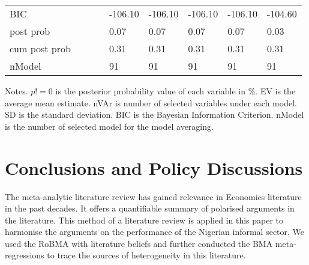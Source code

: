 \documentclass[12pt, english]{article}
\begin{document}
\begin{table}[H]
{\begin{tabular}{@{}lllllllll@{}}
                BIC                         &        &         &        & -106.10 & -106.10 & -106.10 & -106.10 & -104.60 \\
                post prob                   &        &         &        & 0.07    & 0.07    & 0.07    & 0.07    & 0.03    \\
                cum post prob               &        &         &        & 0.31    & 0.31    & 0.31    & 0.31    & 0.31    \\
                nModel                      &        &         &        & 91      & 91      & 91      & 91      & 91      \\ \bottomrule
            \end{tabular}%
        }
        \begin{minipage}{19cm}
            \vspace{0.1cm}
            \small Notes. $p!=0$ is the posterior probability value of each variable in \%. EV is the average mean estimate. nVAr is number of selected variables under each model. SD is the standard deviation. BIC is the Bayesian Information Criterion. nModel is the number of selected model for the model averaging.
        \end{minipage}
    \end{table}


    \section{Conclusions and Policy Discussions}\label{sec:conclusions-and-policy-discussions}
    The meta-analytic literature review has gained relevance in Economics literature in the past decades. It offers a quantifiable summary of polarised arguments in the literature. This method of a literature review is applied in this paper to harmonise the arguments on the performance of the Nigerian informal sector. We used the RoBMA with literature beliefs and further conducted the BMA meta-regressions to trace the sources of heterogeneity in this literature.
\end{document}
